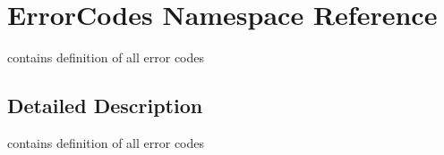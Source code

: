 \hypertarget{namespaceErrorCodes}{
\section{ErrorCodes Namespace Reference}
\label{namespaceErrorCodes}
}


contains definition of all error codes  




\subsection{Detailed Description}
contains definition of all error codes 